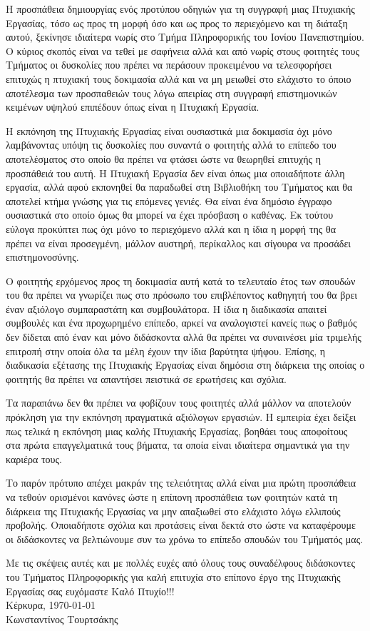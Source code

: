 Η προσπάθεια δημιουργίας ενός προτύπου οδηγιών για τη συγγραφή μιας Πτυχιακής Εργασίας,
τόσο ως προς τη μορφή όσο και ως προς
το περιεχόμενο και τη διάταξη αυτού, ξεκίνησε ιδιαίτερα νωρίς στο 
Τμήμα Πληροφορικής του Ιονίου Πανεπιστημίου.
Ο κύριος σκοπός 
είναι να τεθεί 
με σαφήνεια αλλά και από νωρίς στους φοιτητές τους Τμήματος 
οι δυσκολίες που πρέπει να περάσουν προκειμένου να
τελεσφορήσει επιτυχώς η πτυχιακή τους δοκιμασία 
αλλά και να μη μειωθεί στο ελάχιστο το όποιο αποτέλεσμα
των προσπαθειών τους λόγω απειρίας στη συγγραφή 
επιστημονικών κειμένων υψηλού επιπέδουν όπως είναι
η Πτυχιακή Εργασία.

Η εκπόνηση της Πτυχιακής Εργασίας είναι ουσιαστικά μια δοκιμασία 
όχι μόνο λαμβάνοντας υπόψη τις δυσκολίες 
που συναντά ο φοιτητής αλλά το επίπεδο του αποτελέσματος στο οποίο
θα πρέπει να φτάσει ώστε να θεωρηθεί επιτυχής η προσπάθειά του αυτή.
Η Πτυχιακή Εργασία δεν είναι όπως μια οποιαδήποτε άλλη εργασία, 
αλλά αφού εκπονηθεί θα παραδωθεί στη Βιβλιοθήκη του Τμήματος και θα 
αποτελεί κτήμα γνώσης για τις επόμενες γενιές. Θα είναι
ένα δημόσιο έγγραφο ουσιαστικά στο οποίο όμως θα μπορεί να
έχει πρόσβαση ο καθένας. Εκ τούτου εύλογα προκύπτει πως όχι μόνο
το περιεχόμενο αλλά και η ίδια η μορφή της θα πρέπει να είναι
προσεγμένη, μάλλον αυστηρή, περίκαλλος και σίγουρα να προσάδει
επιστημονοσύνης.

Ο φοιτητής ερχόμενος προς τη δοκιμασία αυτή κατά το τελευταίο έτος
των σπουδών του θα πρέπει να γνωρίζει πως στο πρόσωπο 
του επιβλέποντος καθηγητή του θα βρει έναν
αξιόλογο συμπαραστάτη και συμβουλάτορα.
Η ίδια η διαδικασία απαιτεί συμβουλές και ένα προχωρημένο επίπεδο,
αρκεί να αναλογιστεί
κανείς πως ο βαθμός δεν δίδεται από έναν και μόνο διδάσκοντα αλλά θα
πρέπει να συναινέσει μία τριμελής επιτροπή στην οποία όλα τα
μέλη έχουν την ίδια βαρύτητα ψήφου.
Επίσης, η διαδικασία εξέτασης της Πτυχιακής Εργασίας είναι δημόσια
στη διάρκεια της οποίας ο φοιτητής θα πρέπει να απαντήσει 
πειστικά σε ερωτήσεις και σχόλια.

Τα παραπάνω δεν θα πρέπει να φοβίζουν τους φοιτητές αλλά μάλλον να αποτελούν
πρόκληση για την εκπόνηση πραγματικά αξιόλογων εργασιών.
Η εμπειρία έχει δείξει πως τελικά η εκπόνηση μιας καλής Πτυχιακής Εργασίας,
βοηθάει τους αποφοίτους στα πρώτα επαγγελματικά τους βήματα,
τα οποία είναι ιδιαίτερα σημαντικά για την καριέρα τους.

Το παρόν πρότυπο απέχει μακράν της τελειότητας
αλλά είναι μια πρώτη προσπάθεια να τεθούν 
ορισμένοι κανόνες ώστε η επίπονη προσπάθεια των
φοιτητών κατά τη διάρκεια της Πτυχιακής Εργασίας
να μην απαξιωθεί στο ελάχιστο λόγω ελλιπούς προβολής.
Οποιαδήποτε σχόλια και προτάσεις είναι δεκτά στο  ώστε να
καταφέρουμε οι διδάσκοντες να βελτιώνουμε συν τω χρόνω
το επίπεδο σπουδών του Τμήματός μας. 


Με τις σκέψεις αυτές και με πολλές ευχές
από όλους τους συναδέλφους 
διδάσκοντες του Τμήματος Πληροφορικής
 για καλή επιτυχία στο επίπονο έργο της
Πτυχιακής Εργασίας σας ευχόμαστε Καλό Πτυχίο!!!
\bigskip \\
Κέρκυρα, \today \\
Κωνσταντίνος Τουρτσάκης
 
